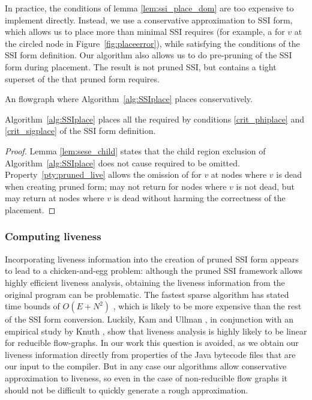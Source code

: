 \documentclass[12pt,titlepage,twoside]{article}
\newcommand{\figscale}{1.0}
\begin{document}
In practice, the conditions of lemma \ref{lem:ssi_place_dom} are too expensive
to implement directly.  Instead, we use a conservative approximation
to SSI form, which allows us to place more  than
minimal SSI requires (for example, a \phifunction for $v$ at the
circled node in Figure~\ref{fig:placeerror}), while satisfying the
conditions of the SSI form definition.  
Our algorithm also allows us to do pre-pruning of the SSI
form during placement.  The result is not pruned SSI, but contains a
tight superset of the  that pruned form requires.
\begin{myfigure}
\centering\renewcommand{\figscale}{0.30}
\caption{An flowgraph where Algorithm~\ref{alg:SSIplace} places
 conservatively.}\label{fig:placeerror}
\end{myfigure}

\begin{theorem}\label{thm:placeproof}
Algorithm~\ref{alg:SSIplace} places all the
 required by conditions \ref{crit_phiplace} and
\ref{crit_sigplace} of the SSI form definition.
\end{theorem}
\begin{proof}
Lemma \ref{lem:sese_child} states that the child region exclusion of
Algorithm~\ref{alg:SSIplace} does not cause required  to
be omitted.  Property~\ref{pty:pruned_live} allows the omission of
 for $v$ at nodes where $v$ is dead when creating
pruned form;  may not return  for nodes
where $v$ is not dead, but may return  at nodes where $v$
is dead without harming the correctness of the \phisigfunction{}
placement.
\end{proof}

\subsubsection{Computing liveness}
Incorporating liveness information into the creation of pruned SSI
form appears to lead to a chicken-and-egg problem: although the pruned
SSI framework allows highly efficient liveness analysis, obtaining the
liveness information from the original program can be problematic.
The fastest sparse algorithm has stated time bounds of $O(E+N^2)$
\cite{ferrante91:pruned}, which is likely to be more expensive than
the rest of the SSI form conversion.  Luckily, Kam and Ullman
\cite{kam76:dataflow}, in conjunction with an empirical study by Knuth
\cite{knuth74:fortran}, show that liveness analysis is highly likely
to be linear for reducible flow-graphs.  In our work this question is
avoided, as we obtain our liveness information directly from
properties of the Java bytecode files that are our input to the
compiler.  But in any case our algorithms allow conservative
approximation to liveness, so even in the case of non-reducible flow
graphs it should not be difficult to quickly generate a rough
approximation.
\end{document}
